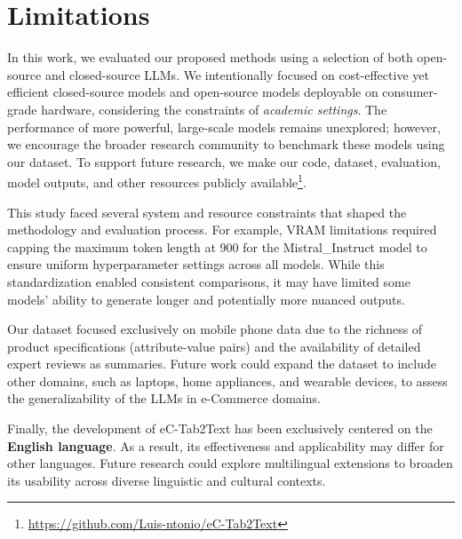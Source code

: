 \section*{Limitations}
\label{sec:limitations}

In this work, we evaluated our proposed methods using a selection of both open-source and closed-source LLMs. We intentionally focused on cost-effective yet efficient closed-source models and open-source models deployable on consumer-grade hardware, considering the constraints of \emph{academic settings}. The performance of more powerful, large-scale models remains unexplored; however, we encourage the broader research community to benchmark these models using our dataset. To support future research, we make our code, dataset, evaluation, model outputs, and other resources publicly available\footnote{\url{https://github.com/Luis-ntonio/eC-Tab2Text}}.

This study faced several system and resource constraints that shaped the methodology and evaluation process. For example, VRAM limitations required capping the maximum token length at 900 for the Mistral\_Instruct model to ensure uniform hyperparameter settings across all models. While this standardization enabled consistent comparisons, it may have limited some models' ability to generate longer and potentially more nuanced outputs.

Our dataset focused exclusively on mobile phone data due to the richness of product specifications (attribute-value pairs) and the availability of detailed expert reviews as summaries. Future work could expand the dataset to include other domains, such as laptops, home appliances, and wearable devices, to assess the generalizability of the LLMs in e-Commerce domains. 

Finally, the development of eC-Tab2Text has been exclusively centered on the \textbf{English language}. As a result, its effectiveness and applicability may differ for other languages. Future research could explore multilingual extensions to broaden its usability across diverse linguistic and cultural contexts.
